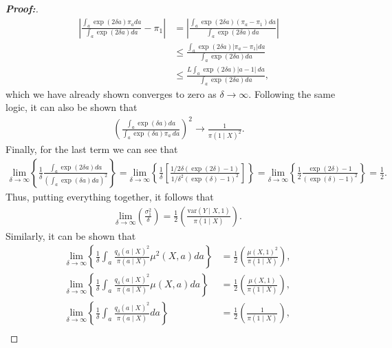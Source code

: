 \documentclass[10pt,a4paper]{amsart}
\newcommand{\var}{\text{var}}
\begin{document}
\begin{proof}[\textbf{Proof:}]
\begin{align*}
    \left| \frac{ \int_a \exp(2 \delta a) \pi_a   da}{ \int_a \exp(2 \delta a)da } - \pi_1 \right| &= \left| \frac{\int_a  \exp(2 \delta a) (\pi_a - \pi_1)  da}{ \int_a \exp(2 \delta a) da }  \right| \\
    &\leq  \frac{\int_a  \exp(2 \delta a) \left|\pi_a - \pi_1 \right|  da}{ \int_a \exp(2 \delta a) da }   \\
    &\leq \frac{L \int_a  \exp(2 \delta a) |a - 1|  \ da}{ \int_a \exp(2 \delta a)da },
\end{align*}
which we have already shown converges to zero as $\delta \to \infty$. Following the same logic, it can also be shown that
\begin{align*}
    \left( \frac{ \int_a \exp(\delta a) da }{ \int_a  \exp(\delta a) \pi_a \ da } \right)^2 \longrightarrow \frac{1}{\pi(1 \mid X)^2}.
\end{align*}
Finally, for the last term we can see that 
\begin{align*}
    \underset{\delta \to \infty}{\text{lim}}\left\{ \frac{1}{\delta} \frac{\int_a \exp(2 \delta a)  da}{\left( \int_a \exp(\delta a)  da \right)^2} \right\} = \underset{\delta \to \infty}{\text{lim}}\left\{ \frac{1}{\delta} \left[ \frac{1/2\delta (\exp(2 \delta) 
- 1)}{1/\delta^2 (\exp(\delta) - 1)^2}\right] \right\} = \underset{\delta \to \infty}{\text{lim}}\left\{ \frac{1}{2} \frac{\exp(2 \delta) - 1}{(\exp(\delta) - 1)^2} \right\} = \frac{1}{2}.
\end{align*}
Thus, putting everything together, it follows that
\begin{align*}
    \underset{\delta \to \infty}{\text{lim}}\left( \frac{\sigma^2_1}{\delta} \right) = \frac{1}{2} \left( \frac{\var(Y\mid X,1)}{\pi(1\mid X)}\right).
\end{align*}
Similarly, it can be shown that
\begin{align*}
     \underset{\delta \to \infty}{\text{lim}}\left\{ \frac{1}{\delta}\int_a \frac{q_\delta(a\mid X)^2}{\pi(a\mid X)}\mu^2(X,a)da \right\} &= \frac{1}{2} \left(\frac{\mu(X,1)^2}{\pi(1\mid X)} \right), \\
     \underset{\delta \to \infty}{\text{lim}}\left\{\frac{1}{\delta}\int_a \frac{q_\delta(a\mid X)^2}{\pi(a\mid X)}\mu(X,a)da \right\} &= \frac{1}{2} \left( \frac{\mu(X,1)}{\pi(1\mid X)} \right) ,\\
     \underset{\delta \to \infty}{\text{lim}}\left\{\frac{1}{\delta}\int_a \frac{q_\delta(a\mid X)^2}{\pi(a\mid X)}da \right\} &= \frac{1}{2} \left( \frac{1}{\pi(1\mid X)} \right), \\

\end{align*}
\end{proof}
\end{document}
